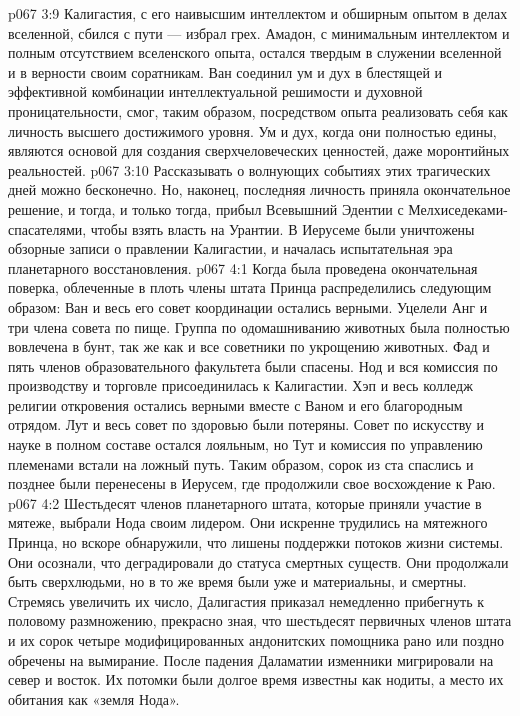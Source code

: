 \vs p067 3:9 Калигастия, с его наивысшим интеллектом и обширным опытом в делах вселенной, сбился с пути --- избрал грех. Амадон, с минимальным интеллектом и полным отсутствием вселенского опыта, остался твердым в служении вселенной и в верности своим соратникам. Ван соединил ум и дух в блестящей и эффективной комбинации интеллектуальной решимости и духовной проницательности, смог, таким образом, посредством опыта реализовать себя как личность высшего достижимого уровня. Ум и дух, когда они полностью едины, являются основой для создания сверхчеловеческих ценностей, даже моронтийных реальностей.
\vs p067 3:10 Рассказывать о волнующих событиях этих трагических дней можно бесконечно. Но, наконец, последняя личность приняла окончательное решение, и тогда, и только тогда, прибыл Всевышний Эдентии с Мелхиседеками\hyp{}спасателями, чтобы взять власть на Урантии. В Иерусеме были уничтожены обзорные записи о правлении Калигастии, и началась испытательная эра планетарного восстановления.
\vs p067 4:1 Когда была проведена окончательная поверка, облеченные в плоть члены штата Принца распределились следующим образом: Ван и весь его совет координации остались верными. Уцелели Анг и три члена совета по пище. Группа по одомашниванию животных была полностью вовлечена в бунт, так же как и все советники по укрощению животных. Фад и пять членов образовательного факультета были спасены. Нод и вся комиссия по производству и торговле присоединилась к Калигастии. Хэп и весь колледж религии откровения остались верными вместе с Ваном и его благородным отрядом. Лут и весь совет по здоровью были потеряны. Совет по искусству и науке в полном составе остался лояльным, но Тут и комиссия по управлению племенами встали на ложный путь. Таким образом, сорок из ста спаслись и позднее были перенесены в Иерусем, где продолжили свое восхождение к Раю.
\vs p067 4:2 Шестьдесят членов планетарного штата, которые приняли участие в мятеже, выбрали Нода своим лидером. Они искренне трудились на мятежного Принца, но вскоре обнаружили, что лишены поддержки потоков жизни системы. Они осознали, что деградировали до статуса смертных существ. Они продолжали быть сверхлюдьми, но в то же время были уже и материальны, и смертны. Стремясь увеличить их число, Далигастия приказал немедленно прибегнуть к половому размножению, прекрасно зная, что шестьдесят первичных членов штата и их сорок четыре модифицированных андонитских помощника рано или поздно обречены на вымирание. После падения Даламатии изменники мигрировали на север и восток. Их потомки были долгое время известны как нодиты, а место их обитания как «земля Нода».
